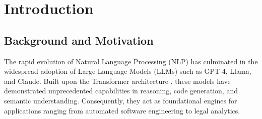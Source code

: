 





\chapter{Introduction}
\label{ch:introduction}

\section{Background and Motivation}
\label{sec:background}

The rapid evolution of Natural Language Processing (NLP) has culminated in the widespread adoption of Large Language Models (LLMs) such as GPT-4, Llama, and Claude. Built upon the Transformer architecture \parencite{vaswani2017attention}, these models have demonstrated unprecedented capabilities in reasoning, code generation, and semantic understanding. Consequently, they act as foundational engines for applications ranging from automated software engineering to legal analytics.

